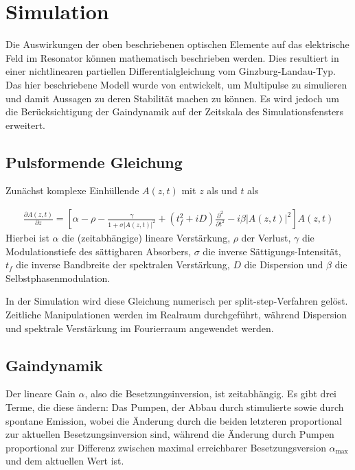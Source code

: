 \documentclass[bachelor,       %
               twoside,        %
               BCOR10mm,       %
               english,ngerman, %
               ]{GAUBM}
\begin{document}
\section{Simulation}
Die Auswirkungen der oben beschriebenen optischen Elemente auf das elektrische Feld im Resonator können mathematisch beschrieben werden.
Dies resultiert in einer nichtlinearen partiellen Differentialgleichung vom Ginzburg-Landau-Typ.
Das hier beschriebene Modell wurde von \cite{kalashnikov_multipulse_2003} entwickelt, um Multipulse zu simulieren und damit Aussagen zu deren Stabilität machen zu können.
Es wird jedoch um die Berücksichtigung der Gaindynamik auf der Zeitskala des Simulationsfensters erweitert.


\subsection{Pulsformende Gleichung}
Zunächst komplexe Einhüllende $A(z,t)$ mit $z$ als und $t$ als 

\begin{align}
	\frac{\partial A(z,t)}{\partial z}=\left[\alpha-\rho-\frac{\gamma}{1+\sigma|A(z,t)|^2}+(t_f^2+iD)\frac{\partial^2}{\partial t^2}-i\beta |A(z,t)|^2\right]A(z,t)
	\label{eq:ginzburgLandau}
\end{align}
Hierbei ist $\alpha$ die (zeitabhängige) lineare Verstärkung, $\rho$ der Verlust, $\gamma$ die Modulationstiefe des sättigbaren Absorbers, $\sigma$ die inverse Sättigungs-Intensität, $t_f$ die inverse Bandbreite der spektralen Verstärkung, $D$ die Dispersion und $\beta$ die Selbstphasenmodulation.

In der Simulation wird diese Gleichung numerisch per split-step-Verfahren gelöst.
Zeitliche Manipulationen werden im Realraum durchgeführt, während Dispersion und spektrale Verstärkung im Fourierraum angewendet werden.

\subsection{Gaindynamik}
Der lineare Gain $\alpha$, also die Besetzungsinversion, ist zeitabhängig.
Es gibt drei Terme, die diese ändern:
Das Pumpen, der Abbau durch stimulierte sowie durch spontane Emission, wobei die Änderung durch die beiden letzteren proportional zur aktuellen Besetzungsinversion sind, während die Änderung durch Pumpen proportional zur Differenz zwischen maximal erreichbarer Besetzungsversion $\alpha_\text{max}$ und dem aktuellen Wert ist.
\end{document}
